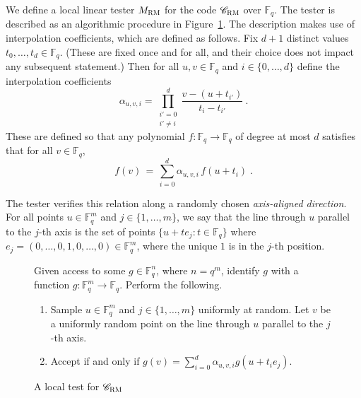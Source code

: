 \documentclass[11pt]{article}
\theoremstyle{definition}
\newcommand{\code}{\mathscr{C}}
\newcommand{\F}{\ensuremath{\mathbb{F}}}
\newcommand{\RM}{\ensuremath{\textsc{RM}}}
\newenvironment{gamespec}{
  \begin{mdframed}[style=figstyle]}{
  \end{mdframed}}
\begin{document}
We define a local linear tester $M_{\RM}$ for the code $\code_\RM$ over $\F_q$. The tester is described as an algorithmic procedure in Figure~\ref{fig:RM-tester}. %
The description makes use of interpolation coefficients, which are defined as follows. Fix $d+1$ distinct values $t_0,\ldots,t_d \in \F_q$. (These are fixed once and for all, and their choice does not impact any subsequent statement.) Then for all $u,v \in \F_q$ and $i \in \{0,\ldots,d\}$ define the interpolation coefficients
 \begin{equation}\label{eq:interp-coeff}
 \alpha_{u,v,i} = \prod_{\substack{i'=0\\i'\neq i}}^{d}  \frac{v - (u + t_{i'})}{t_i - t_{i'}}~.
 \end{equation}
These are defined so that any polynomial $f:\F_q\to\F_q$ of degree at most $d$ satisfies
that for all $v \in \F_q$, 
\[ f(v)\,=\, \sum_{i=0}^{d} \alpha_{u,v,i} \, f(u+t_i)\;.\]

The tester verifies this relation along a randomly chosen \emph{axis-aligned direction}.  For all points $u \in \F_q^m$ and $j \in \{1,\ldots,m\}$, we say that the line through $u$ parallel to the $j$-th axis is the set of points $\{ u + te_j : t \in \F_q \}$ where $e_j=(0,\ldots,0,1,0,\ldots,0)\in \F_q^m$, where the unique $1$ is in the $j$-th position. 


\begin{figure}[!htbp]
  \centering
  \begin{gamespec}
Given access to some $g\in \F_q^n$, where $n=q^m$, identify $g$ with a function $g:\F_q^m\to \F_q$. Perform the following.
\begin{enumerate}
	\item Sample	$u\in \F_q^m$ and $j\in \{1,\ldots,m\}$ uniformly at random. Let $v$ be a uniformly random point on the line through $u$ parallel to the $j$-th axis.
	\item 
	Accept if and only if $g(v) = \sum_{i=0}^{d} \alpha_{u,v,i} g(u+t_i e_j)$. 
    \end{enumerate}
  \end{gamespec}
  \caption{A local test for $\code_{\RM}$}
  \label{fig:RM-tester}
\end{figure}
\end{document}
